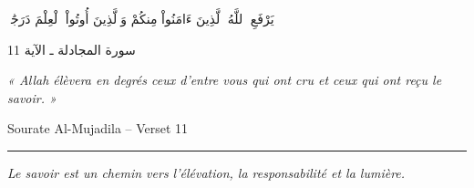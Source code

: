 \documentclass[11pt,titlepage,a4paper,openany]{book}
\begin{document}


\newpage
\thispagestyle{empty}

\begin{center}
	
	\vspace*{5cm}
	
	{\Huge \textarabic{يَرْفَعِ ٱللَّهُ ٱلَّذِينَ ءَامَنُواْ مِنكُمْ وَٱلَّذِينَ أُوتُواْ ٱلْعِلْمَ دَرَجَٰتٍۚ}}
	
	\vspace{0.8cm}
	
	{\Large \textarabic{سورة المجادلة ـ الآية 11}}
	
	\vspace{2cm}
	
	\begin{minipage}{0.8\textwidth}
		\centering
		\Large\itshape
		« Allah élèvera en degrés ceux d’entre vous qui ont cru et ceux qui ont reçu le savoir. »
	\end{minipage}
	
	\vspace{0.8cm}
	
	{\large Sourate Al-Mujadila -- Verset 11}
	
	\vfill
	
	\rule{0.5\textwidth}{0.5pt}
	
	\vspace{0.5cm}
	
	{\normalsize\itshape
		Le savoir est un chemin vers l’élévation, la responsabilité et la lumière.
	}
	
\end{center}

\newpage
\thispagestyle{empty}


\thispagestyle{empty}


\thispagestyle{empty}


\thispagestyle{empty}


\pagestyle{headings}

\tableofcontents
\thispagestyle{empty}
\thispagestyle{empty}











\end{document}
